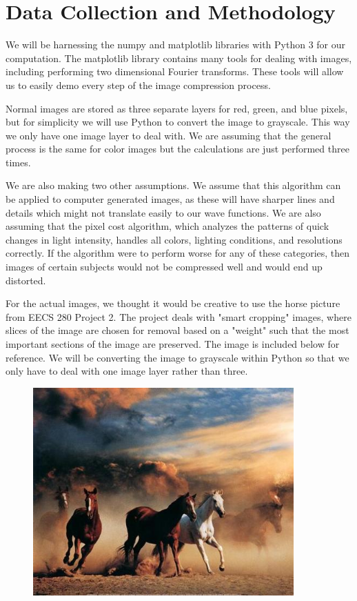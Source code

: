 \documentclass[12pt]{article}
\begin{document}
\section{Data Collection and Methodology}

We will be harnessing the numpy and matplotlib libraries with Python 3 for our computation. The matplotlib library contains many tools for dealing with images, including performing two dimensional Fourier transforms. These tools will allow us to easily demo every step of the image compression process.

Normal images are stored as three separate layers for red, green, and blue pixels, but for simplicity we will use Python to convert the image to grayscale. This way we only have one image layer to deal with. We are assuming that the general process is the same for color images but the calculations are just performed three times.

We are also making two other assumptions. We assume that this algorithm can be applied to computer generated images, as these will have sharper lines and details which might not translate easily to our wave functions. We are also assuming that the pixel cost algorithm, which analyzes the patterns of quick changes in light intensity, handles all colors, lighting conditions, and resolutions correctly. If the algorithm were to perform worse for any of these categories, then images of certain subjects would not be compressed well and would end up distorted.

For the actual images, we thought it would be creative to use the horse picture from EECS 280 Project 2. The project deals with "smart cropping" images, where slices of the image are chosen for removal based on a "weight" such that the most important sections of the image are preserved. The image is included below for reference. We will be converting the image to grayscale within Python so that we only have to deal with one image layer rather than three.

\begin{figure}[ht]
	\centering
	\includegraphics[width=10cm]{horses.png}
\end{figure}
\end{document}

